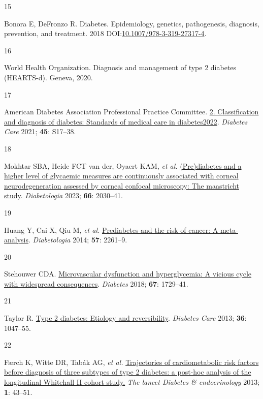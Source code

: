 \documentclass[
  a4paper,
  headsepline=true,
  open=any]{scrbook}
\newlength{\cslhangindent}
\newlength{\csllabelwidth}
\newlength{\cslentryspacingunit} %
\newenvironment{CSLReferences}[2] %
 {%
  \setlength{\parindent}{0pt}
  \ifodd #1
  \let\oldpar\par
  \def\par{\hangindent=\cslhangindent\oldpar}
  \fi
  \setlength{\parskip}{#2\cslentryspacingunit}
 }%
 {}
\newcommand{\CSLLeftMargin}[1]{\parbox[t]{\csllabelwidth}{#1}}
\newcommand{\CSLRightInline}[1]{\parbox[t]{\linewidth - \csllabelwidth}{#1}\break}
\begin{document}
\begin{CSLReferences}{0}{0}
\leavevmode{}%
\CSLLeftMargin{15 }%
\CSLRightInline{Bonora E, DeFronzo R. Diabetes. Epidemiology, genetics,
pathogenesis, diagnosis, prevention, and treatment. 2018
DOI:\href{https://doi.org/10.1007/978-3-319-27317-4}{10.1007/978-3-319-27317-4}.}

\leavevmode{}%
\CSLLeftMargin{16 }%
\CSLRightInline{World Health Organization. Diagnosis and management of
type 2 diabetes (HEARTS-d). Geneva, 2020.}

\leavevmode{}%
\CSLLeftMargin{17 }%
\CSLRightInline{American Diabetes Association Professional Practice
Committee. \href{https://doi.org/10.2337/dc22-S002}{2. Classification
and diagnosis of diabetes: Standards of medical care in
diabetes{\textemdash}2022}. \emph{Diabetes Care} 2021; \textbf{45}:
S17--38.}

\leavevmode{}%
\CSLLeftMargin{18 }%
\CSLRightInline{Mokhtar SBA, Heide FCT van der, Oyaert KAM, \emph{et
al.} \href{https://doi.org/10.1007/s00125-023-05986-5}{(Pre)diabetes and
a higher level of glycaemic measures are continuously associated with
corneal neurodegeneration assessed by corneal confocal microscopy: The
maastricht study}. \emph{Diabetologia} 2023; \textbf{66}: 2030--41.}

\leavevmode{}%
\CSLLeftMargin{19 }%
\CSLRightInline{Huang Y, Cai X, Qiu M, \emph{et al.}
\href{https://doi.org/10.1007/s00125-014-3361-2}{Prediabetes and the
risk of cancer: A meta-analysis}. \emph{Diabetologia} 2014; \textbf{57}:
2261--9.}

\leavevmode{}%
\CSLLeftMargin{20 }%
\CSLRightInline{Stehouwer CDA.
\href{https://doi.org/10.2337/dbi17-0044}{Microvascular dysfunction and
hyperglycemia: A vicious cycle with widespread consequences}.
\emph{Diabetes} 2018; \textbf{67}: 1729--41.}

\leavevmode{}%
\CSLLeftMargin{21 }%
\CSLRightInline{Taylor R. \href{https://doi.org/10.2337/dc12-1805}{Type
2 diabetes: Etiology and reversibility}. \emph{Diabetes Care} 2013;
\textbf{36}: 1047--55.}

\leavevmode{}%
\CSLLeftMargin{22 }%
\CSLRightInline{Færch K, Witte DR, Tabák AG, \emph{et al.}
\href{https://doi.org/10.1016/S2213-8587(13)70008-1}{Trajectories of
cardiometabolic risk factors before diagnosis of three subtypes of type
2 diabetes: a post-hoc analysis of the longitudinal Whitehall II cohort
study.} \emph{The lancet Diabetes \& endocrinology} 2013; \textbf{1}:
43--51.}


\end{CSLReferences}
\end{document}
